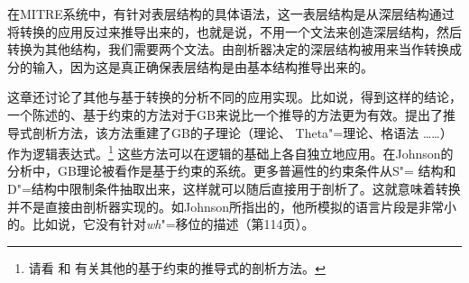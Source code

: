 \addlines
在MITRE系统\citep{ZFHW65a}中，有针对表层结构的具体语法，这一表层结构是从深层结构通过将转换的应用反过来推导出来的，也就是说，不用一个文法来创造深层结构，然后转换为其他结构，我们需要两个文法。由剖析器决定的深层结构被用来当作转换成分的输入，因为这是真正确保表层结构是由基本结构推导出来的\citep[]{Kay2011a}。

这章还讨论了其他与基于转换的分析不同的应用实现。比如说，\citet[, Section~4]{KT91a}得到这样的结论，一个陈述的、基于约束的方法对于GB来说比一个推导的方法更为有效。\citet{Johnson89a}提出了推导式剖析方法，该方法重建了GB的子理论（\xbar 理论、
Theta"=理论、格语法 \ldots\ldots）作为逻辑表达式。\footnote{
请看 和 有关其他的基于约束的推导式的剖析方法。
}
这些方法可以在逻辑的基础上各自独立地应用。在Johnson的分析中，GB理论被看作是基于约束的系统。更多普遍性的约束条件从S"= 结构和D"=结构中限制条件抽取出来，这样就可以随后直接用于剖析了。这就意味着转换并不是直接由剖析器实现的。如Johnson所指出的，他所模拟的语言片段是非常小的。比如说，它没有针对\emph{wh}"=移位的描述（第114页）。

